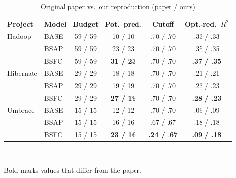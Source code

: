 \documentclass[conference]{IEEEtran}
\begin{document}
\begin{table}[t]
\centering
\caption{Original paper vs.\ our reproduction (paper / ours)}
\label{tab:compare}
\footnotesize
\setlength{\tabcolsep}{3.5pt}
\begin{tabular}{@{}llcccc@{}}
\toprule
Project & Model & Budget & Pot.\ pred. & Cutoff & Opt.-red.\ $R^2$ \\
\midrule
Hadoop & BASE & 59 / 59 & 10 / 10 & .70 / .70 & .33 / .33 \\
 & BSAP & 59 / 59 & 23 / 23 & .70 / .70 & .35 / .35 \\
 & BSFC & 59 / 59 & \textbf{31 / 23} & .70 / .70 & \textbf{.37 / .35} \\
\midrule
Hibernate & BASE & 29 / 29 & 18 / 18 & .70 / .70 & .21 / .21 \\
 & BSAP & 29 / 29 & 19 / 19 & .70 / .70 & .23 / .23 \\
 & BSFC & 29 / 29 & \textbf{27 / 19} & .70 / .70 & \textbf{.28 / .23} \\
\midrule
Umbraco & BASE & 15 / 15 & 12 / 12 & .70 / .70 & .09 / .09 \\
 & BSAP & 15 / 15 & 16 / 16 & .67 / .67 & .18 / .18 \\
 & BSFC & 15 / 15 & \textbf{23 / 16} & \textbf{.24 / .67} & \textbf{.09 / .18} \\
\bottomrule
\end{tabular}
\\[2pt]
\raggedright\scriptsize Bold marks values that differ from the paper.
\end{table}
\end{document}
